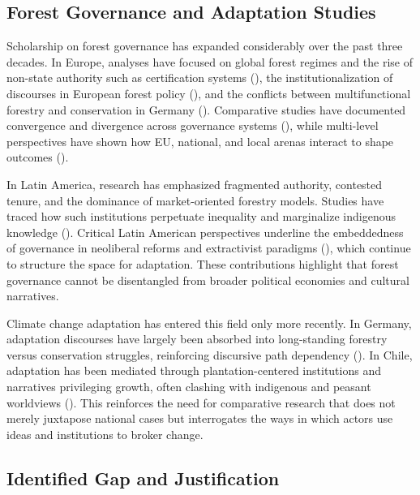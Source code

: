 \subsection*{Forest Governance and Adaptation Studies}

Scholarship on forest governance has expanded considerably over the past three decades. 
In Europe, analyses have focused on global forest regimes and the rise of 
non-state authority such as certification systems (\cite{Cashore2004}), 
the institutionalization of discourses in European forest policy 
(\cite{ArtsBuizer2009}), and the conflicts between multifunctional forestry 
and conservation in Germany (\cite{Winkel2011}). Comparative studies have 
documented convergence and divergence across governance systems 
(\cite{HowlettRayner2006}), while multi-level perspectives have shown how 
EU, national, and local arenas interact to shape outcomes (\cite{Arts2006,Pulzl2013}). 

In Latin America, research has emphasized fragmented authority, contested tenure, 
and the dominance of market-oriented forestry models. Studies have traced how 
such institutions perpetuate inequality and marginalize indigenous knowledge 
(\cite{LarsonRibot2007,AnderssonPacheco2006,Manuschevich2016}). 
Critical Latin American perspectives underline the embeddedness of governance 
in neoliberal reforms and extractivist paradigms (\cite{Gudynas2011,Escobar1996}), 
which continue to structure the space for adaptation. These contributions highlight 
that forest governance cannot be disentangled from broader political economies 
and cultural narratives.

Climate change adaptation has entered this field only more recently. In Germany, 
adaptation discourses have largely been absorbed into long-standing forestry versus 
conservation struggles, reinforcing discursive path dependency (\cite{Winkel2011}). 
In Chile, adaptation has been mediated through plantation-centered institutions 
and narratives privileging growth, often clashing with indigenous and peasant 
worldviews (\cite{Manuschevich2016}). This reinforces the need for comparative 
research that does not merely juxtapose national cases but interrogates the ways 
in which actors use ideas and institutions to broker change.


\subsection*{Identified Gap and Justification}

